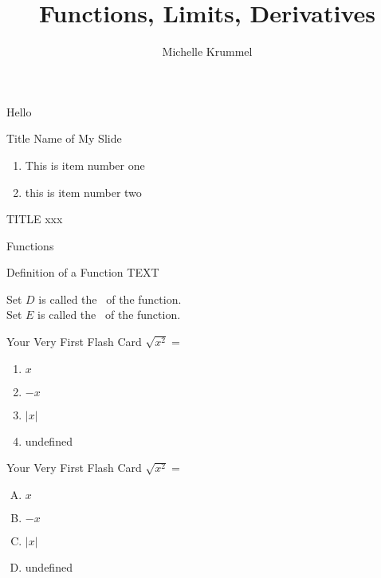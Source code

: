 \documentclass{beamer}
\title{Functions, Limits, Derivatives}
\author{Michelle Krummel}
\institute{\large \textbf{Learning Outcomes}:\\[6pt]Identify properties}
\date{}
\begin{document}

\begin{frame}
\titlepage
\end{frame}

\begin{frame}
Hello
\end{frame}

\begin{frame}[t]{Title Name of My Slide} \vspace{10pt}
\begin{enumerate}
\item This is item number one
\item this is item number two
\end{enumerate}
\end{frame}

\begin{frame}[t]{TITLE} \vspace{4pt}
xxx
\end{frame}

\begin{frame}[t]{Functions} \vspace{4pt}
\begin{block}{Definition of a Function}
\vspace{0.5em}
TEXT
\vspace{0.5em}
\end{block}

\vspace{10pt}
Set $D$ is called the 
\, of the function.\\[10pt]

Set $E$ is called the 
\, of the function.

\end{frame}

\begin{frame}[t]{Your Very First Flash Card}
$\sqrt{x^2}=$\\[10pt]
\begin{enumerate}
\item $x$
\item $-x$
\item $|x|$
\item undefined
\end{enumerate}
\end{frame}

\begin{frame}[t]{Your Very First Flash Card} \vspace{10pt}
$\sqrt{x^2}=$\\[10pt]
\begin{enumerate}[(A)]
\item $x$
\item $-x$
\item $|x|$
\item undefined
\end{enumerate}
\end{frame}
\end{document}

